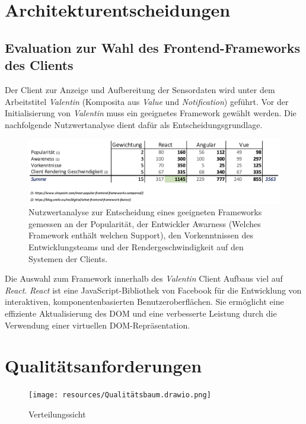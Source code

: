 \documentclass[
]{article}
\begin{document}
\section{Architekturentscheidungen}
\subsection{Evaluation zur Wahl des Frontend-Frameworks des Clients}

Der Client zur Anzeige und Aufbereitung der Sensordaten wird unter dem Arbeitstitel \textit{Valentin} (Komposita aus \textit{Value} und \textit{Notification}) geführt. Vor der Initialisierung von \textit{Valentin} muss ein geeignetes Framework gewählt werden. Die nachfolgende Nutzwertanalyse dient dafür als Entscheidungsgrundlage. 

\begin{figure}
  \centering
  \includegraphics[width=1\textwidth]{./resources/techevaluationfe.png}
  \caption{Nutzwertanalyse zur Entscheidung eines geeigneten Frameworks gemessen an der Popularität, der Entwickler Awarness (Welches Framework enthält welchen Support), den Vorkenntnissen des Entwicklungsteams und der Rendergeschwindigkeit auf den Systemen der Clients.}
  \label{fig:deine_label}
\end{figure}

Die Auswahl zum Framework innerhalb des \textit{Valentin} Client Aufbaus viel auf \textit{React}. \textit{React} ist eine JavaScript-Bibliothek von Facebook für die Entwicklung von interaktiven, komponentenbasierten Benutzeroberflächen. Sie ermöglicht eine effiziente Aktualisierung des DOM und eine verbesserte Leistung durch die Verwendung einer virtuellen DOM-Repräsentation.

\section{Qualitätsanforderungen}
\begin{figure}[htbp]
	\centering
	\texttt{[image: resources/Qualitätsbaum.drawio.png]}
	\caption{Verteilungssicht}
	\label{fig:Verteilungssicht}
\end{figure}  
\end{document}
